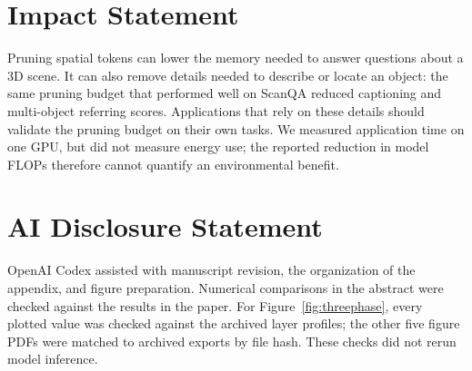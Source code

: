 \section*{Impact Statement}
Pruning spatial tokens can lower the memory needed to answer questions about a 3D scene. It can also remove details needed to describe or locate an object: the same pruning budget that performed well on ScanQA reduced captioning and multi-object referring scores. Applications that rely on these details should validate the pruning budget on their own tasks. We measured application time on one GPU, but did not measure energy use; the reported reduction in model FLOPs therefore cannot quantify an environmental benefit.

\section*{AI Disclosure Statement}
OpenAI Codex assisted with manuscript revision, the organization of the appendix, and figure preparation. Numerical comparisons in the abstract were checked against the results in the paper. For Figure~\ref{fig:threephase}, every plotted value was checked against the archived layer profiles; the other five figure PDFs were matched to archived exports by file hash. These checks did not rerun model inference.
